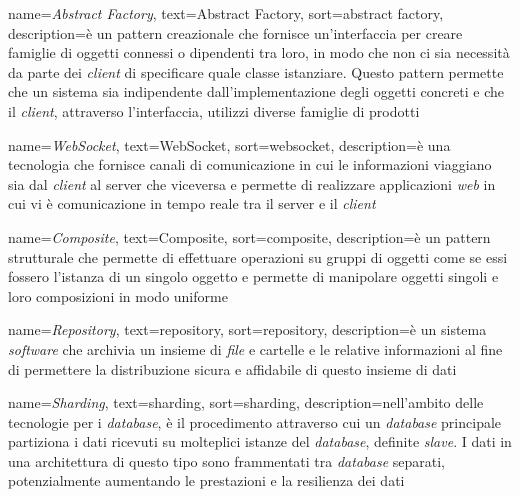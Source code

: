 {
  name=\emph{Abstract Factory},
  text=Abstract Factory,
  sort=abstract factory,
  description={è un \gls{pattern} creazionale che fornisce un'interfaccia per creare famiglie di oggetti connessi o dipendenti tra loro, in modo che non ci sia necessità da parte dei \emph{client} di specificare quale classe istanziare. Questo pattern permette che un sistema sia indipendente dall'implementazione degli oggetti concreti e che il \emph{client}, attraverso l'interfaccia, utilizzi diverse famiglie di prodotti}
}

{
  name=\emph{WebSocket},
  text=WebSocket,
  sort=websocket,
  description={è una tecnologia che fornisce canali di comunicazione in cui le informazioni viaggiano sia dal \emph{client} al server che viceversa e permette di realizzare applicazioni \emph{web} in cui vi è comunicazione in tempo reale tra il server e il \emph{client}}
}

{
  name=\emph{Composite},
  text=Composite,
  sort=composite,
  description={è un \gls{pattern} strutturale che permette di effettuare operazioni su gruppi di oggetti come se essi fossero l'istanza di un singolo oggetto e permette di manipolare oggetti singoli e loro composizioni in modo uniforme}
}

{
  name=\emph{Repository},
  text=repository,
  sort=repository,
  description={è un sistema \emph{software} che archivia un insieme di \emph{file} e cartelle e le relative informazioni al fine di permettere la distribuzione sicura e affidabile di questo insieme di dati}
}

{
  name=\emph{Sharding},
  text=sharding,
  sort=sharding,
  description={nell'ambito delle tecnologie per i \emph{database}, è il procedimento attraverso cui un \emph{database} principale partiziona i dati ricevuti su molteplici istanze del \emph{database}, definite \emph{slave}. I dati in una architettura di questo tipo sono frammentati tra \emph{database} separati, potenzialmente aumentando le prestazioni e la resilienza dei dati}
}
